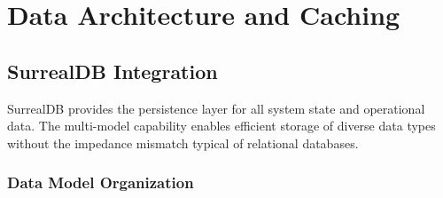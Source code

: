 \documentclass[12pt,a4paper,twoside]{report}
\begin{document}

\chapter{Data Architecture and Caching}

\section{SurrealDB Integration}

SurrealDB provides the persistence layer for all system state and operational data. The multi-model capability enables efficient storage of diverse data types without the impedance mismatch typical of relational databases.

\subsection{Data Model Organization}
\end{document}
